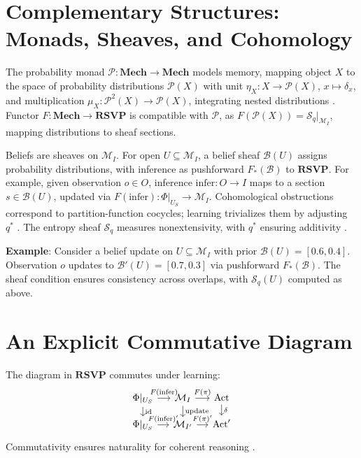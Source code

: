 \documentclass{article}
\theoremstyle{plain}
\theoremstyle{definition}
\begin{document}
\section{Complementary Structures: Monads, Sheaves, and Cohomology}

The probability monad $\mathcal{P}: \mathbf{Mech} \to \mathbf{Mech}$ models memory, mapping object $X$ to the space of probability distributions $\mathcal{P}(X)$ with unit $\eta_X: X \to \mathcal{P}(X)$, $x \mapsto \delta_x$, and multiplication $\mu_X: \mathcal{P}^2(X) \to \mathcal{P}(X)$, integrating nested distributions \cite{Giry1982}. Functor $F: \mathbf{Mech} \to \mathbf{RSVP}$ is compatible with $\mathcal{P}$, as $F(\mathcal{P}(X)) = \mathcal{S}_q|_{\mathcal{M}_I}$, mapping distributions to sheaf sections.

Beliefs are sheaves on $\mathcal{M}_I$. For open $U \subseteq \mathcal{M}_I$, a belief sheaf $\mathcal{B}(U)$ assigns probability distributions, with inference as pushforward $F_*(\mathcal{B})$ to $\mathbf{RSVP}$. For example, given observation $o \in O$, inference $\text{infer}: O \to I$ maps to a section $s \in \mathcal{B}(U)$, updated via $F(\text{infer}): \Phi|_{U_S} \to \mathcal{M}_I$. Cohomological obstructions correspond to partition-function cocycles; learning trivializes them by adjusting $q^*$ \cite{Soares2024,Tsallis1988}. The entropy sheaf $\mathcal{S}_q$ measures nonextensivity, with $q^*$ ensuring additivity \cite{Soares2023physica}.

\textbf{Example}: Consider a belief update on $U \subseteq \mathcal{M}_I$ with prior $\mathcal{B}(U) = [0.6, 0.4]$. Observation $o$ updates to $\mathcal{B}'(U) = [0.7, 0.3]$ via pushforward $F_*(\mathcal{B})$. The sheaf condition ensures consistency across overlaps, with $\mathcal{S}_q(U)$ computed as above.

\section{An Explicit Commutative Diagram}

The diagram in $\mathbf{RSVP}$ commutes under learning:
\[
\begin{tikzcd}[scale=0.6, column sep=small, row sep=small, every node/.style={font=\small}, ampersand replacement=\&]
\Phi|_{U_S} \arrow[r, "F(\text{infer})"] \arrow[d, "\text{id}"] \& \mathcal{M}_I \arrow[r, "F(\pi)"] \arrow[d, "\text{update}"] \& \text{Act} \arrow[d, "\delta"] \\
\Phi|_{U_S} \arrow[r, "F(\text{infer})'"] \& \mathcal{M}_{I'} \arrow[r, "F(\pi)'"] \& \text{Act}'
\end{tikzcd}
\]
Commutativity ensures naturality for coherent reasoning \cite{Spivak2014}.
\end{document}
